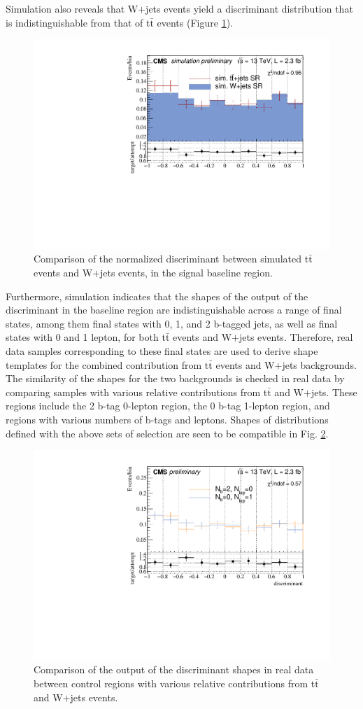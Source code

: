 Simulation also reveals that W$+$jets events yield a discriminant distribution that is indistinguishable from that of t$\bar{\text{t}}$ events (Figure \ref{fig:ttbarVsWjets}).
\begin{figure}[tb!]
\centering
\includegraphics[width=0.55\linewidth]{figures/SusySearches/MvaSusy/TTWSimCompare.pdf}
\caption{Comparison of the normalized discriminant between simulated t$\bar{\text{t}}$ events and W$+$jets events, in the signal baseline region.}
\label{fig:ttbarVsWjets}
\end{figure}
Furthermore, simulation indicates that the shapes of the output of the discriminant in the baseline region are indistinguishable across a range of final states, among them final states with 0, 1, and 2 b-tagged jets, as well as final states with 0 and 1 lepton, for both t$\bar{\text{t}}$ events and W$+$jets events. Therefore, real data samples corresponding to these final states are used to derive shape templates for the combined contribution from t$\bar{\text{t}}$ events and W$+$jets backgrounds. The similarity of the shapes for the two backgrounds is checked in real data by comparing samples with various relative contributions from t$\bar{\text{t}}$ and W$+$jets. These regions include the 2 b-tag 0-lepton region, the 0 b-tag 1-lepton region, and regions with various numbers of b-tags and leptons. Shapes of distributions defined with the above sets of selection are seen to be compatible in Fig. \ref{fig:data2b0lVs1b1l}.
\begin{figure}[tb!]
\centering
\includegraphics[width=0.55\linewidth]{figures/SusySearches/MvaSusy/Data_2b0Lvs0b1L.pdf}
\caption{Comparison of the output of the discriminant shapes in real data between control regions with various relative contributions from t$\bar{\text{t}}$ and W$+$jets events.}
\label{fig:data2b0lVs1b1l}
\end{figure}


